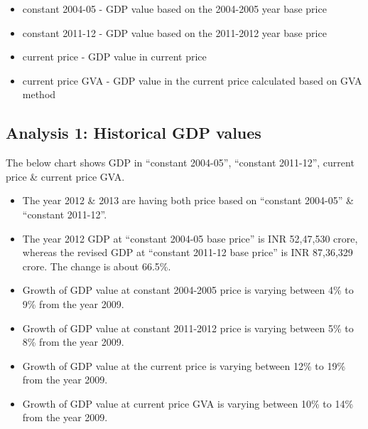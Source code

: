 \documentclass[]{article}
\providecommand{\tightlist}{%
  \setlength{\itemsep}{0pt}\setlength{\parskip}{0pt}}
\begin{document}
\begin{itemize}
\tightlist
\item
  constant 2004-05 - GDP value based on the 2004-2005 year base price
\item
  constant 2011-12 - GDP value based on the 2011-2012 year base price
\item
  current price - GDP value in current price
\item
  current price GVA - GDP value in the current price calculated based on
  GVA method
\end{itemize}

\hypertarget{analysis-1-historical-gdp-values}{%
\subsection{Analysis 1: Historical GDP
values}\label{analysis-1-historical-gdp-values}}

The below chart shows GDP in ``constant 2004-05'', ``constant 2011-12'',
current price \& current price GVA.

\begin{itemize}
\tightlist
\item
  The year 2012 \& 2013 are having both price based on ``constant
  2004-05'' \& ``constant 2011-12''.
\item
  The year 2012 GDP at ``constant 2004-05 base price'' is INR 52,47,530
  crore, whereas the revised GDP at ``constant 2011-12 base price'' is
  INR 87,36,329 crore. The change is about 66.5\%.
\item
  Growth of GDP value at constant 2004-2005 price is varying between 4\%
  to 9\% from the year 2009.
\item
  Growth of GDP value at constant 2011-2012 price is varying between 5\%
  to 8\% from the year 2009.
\item
  Growth of GDP value at the current price is varying between 12\% to
  19\% from the year 2009.
\item
  Growth of GDP value at current price GVA is varying between 10\% to
  14\% from the year 2009.
\end{itemize}
\end{document}
